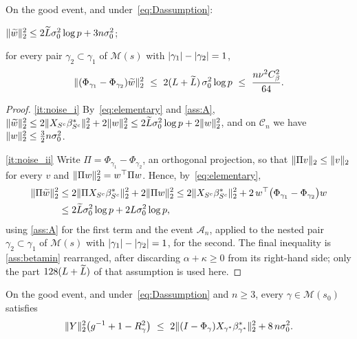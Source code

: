 \begin{lemma}
    \label{lemma:noise}
    On the good event, and under~\eqref{eq:Dassumption}:
    \begin{equivcond}
        \item\label{it:noise_i}
        $\lVert\widetilde w\rVert_2^{2}\leq2\widetilde{L}\sigma_0^{2}\log p
        +3n\sigma_0^{2}$;
        \item\label{it:noise_ii} for every pair
        $\gamma_2\subset\gamma_1$ of $\mathscr{M}(s)$ with
        $\lvert\gamma_1\rvert-\lvert\gamma_2\rvert=1$,
        \begin{equation*}
            \lVert(\Phi_{\gamma_1}-\Phi_{\gamma_2})\widetilde w\rVert_2^{2}
            \ \leq\ 2(L+\widetilde{L})\,\sigma_0^{2}\log p
            \ \leq\ \frac{n\nu^{2}C_\beta^{2}}{64} .
        \end{equation*}
    \end{equivcond}
\end{lemma}

\begin{proof}
    \ref{it:noise_i} By~\eqref{eq:elementary} and \cref{ass:A},
    $\lVert\widetilde w\rVert_2^{2}\leq2\lVert X_{S^{c}}
        \beta^\ast_{S^{c}}\rVert_2^{2}+2\lVert w\rVert_2^{2}
    \leq2\widetilde{L}\sigma_0^{2}\log p+2\lVert w\rVert_2^{2}$, and on $\mathcal{C}_n$
    we have $\lVert w\rVert_2^{2}\leq\tfrac32n\sigma_0^{2}$.

    \ref{it:noise_ii} Write $\Pi=\Phi_{\gamma_1}-\Phi_{\gamma_2}$, an
    orthogonal projection, so that $\lVert\Pi v\rVert_2\leq\lVert v\rVert_2$ for every
    $v$ and $\lVert\Pi w\rVert_2^{2}=w^{\top}\Pi w$. Hence,
    by~\eqref{eq:elementary},
    \begin{align*}
        \lVert\Pi\widetilde w\rVert_2^{2}
        &\leq2\lVert\Pi X_{S^{c}}\beta^\ast_{S^{c}}\rVert_2^{2}
        +2\lVert\Pi w\rVert_2^{2}
        \leq2\lVert X_{S^{c}}\beta^\ast_{S^{c}}\rVert_2^{2}
        +2\,w^{\top}\bigl(\Phi_{\gamma_1}-\Phi_{\gamma_2}\bigr)w\\
        &\leq2\widetilde{L}\sigma_0^{2}\log p+2L\sigma_0^{2}\log p,
    \end{align*}
    using \cref{ass:A} for the first term and the event $\mathcal{A}_n$,
    applied to the nested pair $\gamma_2\subset\gamma_1$ of
    $\mathscr{M}(s)$ with $\lvert\gamma_1\rvert-\lvert\gamma_2\rvert=1$, for the
    second. The final inequality is \cref{ass:betamin} rearranged, after
    discarding $\alpha+\kappa\geq0$ from its right-hand side; only the part
    $128(L+\widetilde{L})$ of that assumption is used here.
\end{proof}

\begin{lemma}
    \label{lemma:Dupper}
    On the good event, and under~\eqref{eq:Dassumption} and $n\geq3$, every
    $\gamma\in\mathscr{M}(s_0)$ satisfies
    \begin{equation}
        \label{eq:Dupper}
        \lVert Y\rVert_2^{2}\bigl(g^{-1}+1-R^{2}_{\gamma}\bigr)
        \ \leq\ 2\lVert(I-\Phi_\gamma)X_{\gamma^{\ast}}\beta^{\ast}_{\gamma^{\ast}}\rVert_2^{2}
        +8\,n\sigma_0^{2} .
    \end{equation}
\end{lemma}

